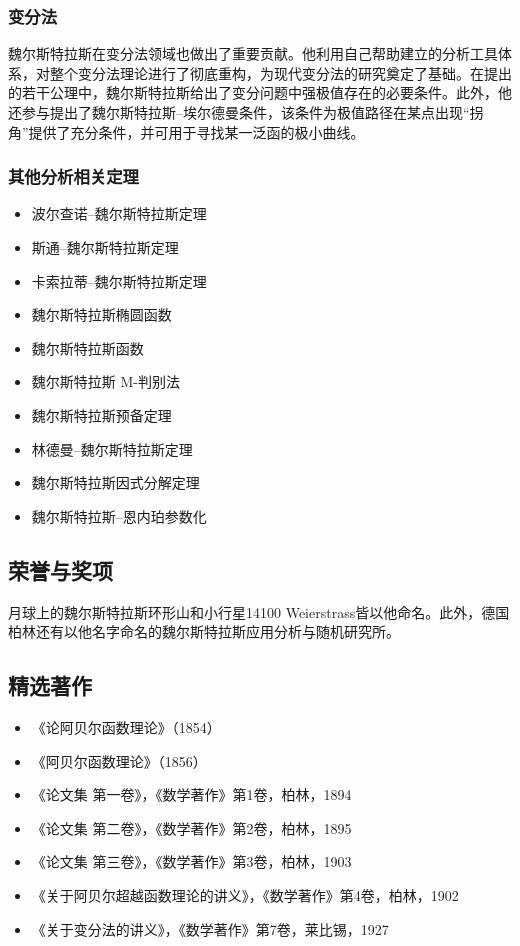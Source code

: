 \subsubsection{变分法}
魏尔斯特拉斯在变分法领域也做出了重要贡献。他利用自己帮助建立的分析工具体系，对整个变分法理论进行了彻底重构，为现代变分法的研究奠定了基础。在提出的若干公理中，魏尔斯特拉斯给出了变分问题中强极值存在的必要条件。此外，他还参与提出了魏尔斯特拉斯–埃尔德曼条件，该条件为极值路径在某点出现“拐角”提供了充分条件，并可用于寻找某一泛函的极小曲线。
\subsubsection{其他分析相关定理}
\begin{itemize}
\item 波尔查诺–魏尔斯特拉斯定理
\item 斯通–魏尔斯特拉斯定理
\item 卡索拉蒂–魏尔斯特拉斯定理
\item 魏尔斯特拉斯椭圆函数
\item 魏尔斯特拉斯函数
\item 魏尔斯特拉斯 M-判别法
\item 魏尔斯特拉斯预备定理
\item 林德曼–魏尔斯特拉斯定理
\item 魏尔斯特拉斯因式分解定理
\item 魏尔斯特拉斯–恩内珀参数化
\end{itemize}
\subsection{荣誉与奖项}
月球上的魏尔斯特拉斯环形山和小行星14100 Weierstrass皆以他命名。此外，德国柏林还有以他名字命名的魏尔斯特拉斯应用分析与随机研究所。
\subsection{精选著作}
\begin{itemize}
\item 《论阿贝尔函数理论》（1854）
\item 《阿贝尔函数理论》（1856）
\item 《论文集 第一卷》，《数学著作》第1卷，柏林，1894
\item 《论文集 第二卷》，《数学著作》第2卷，柏林，1895
\item 《论文集 第三卷》，《数学著作》第3卷，柏林，1903
\item 《关于阿贝尔超越函数理论的讲义》，《数学著作》第4卷，柏林，1902
\item 《关于变分法的讲义》，《数学著作》第7卷，莱比锡，1927
\end{itemize}
